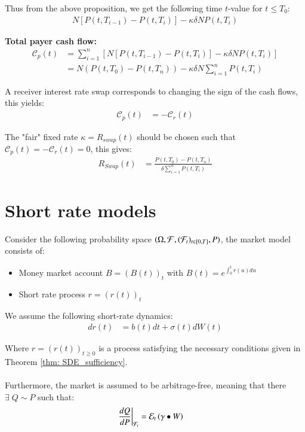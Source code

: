 Thus from the above proposition, we get the following time $t$-value for $t\leq T_{0}$:
\begin{align*}
N[P(t,T_{i-1}) - P(t,T_{i})] - \kappa\delta N P(t,T_{i})   
\end{align*}

\textbf{Total payer cash flow:}
\begin{align*}
\mathcal{C}_{p}(t) &= \sum_{i=1}^{n}\left[
 N[P(t,T_{i-1}) - P(t,T_{i})] - \kappa\delta N P(t,T_{i}) 
\right]  \\
&= N(P(t,T_{0})-P(t,T_{n})) - \kappa\delta N\sum_{i=1}^{n}P(t,T_{i})
\end{align*} 

A receiver interest rate swap corresponds to changing the sign of the cash flows, this yields:
\begin{align*}
\mathcal{C}_{p}(t) &= -\mathcal{C}_{r}(t)    
\end{align*}

\begin{result}
The "fair" fixed rate $\kappa = R_{swap}(t)$ should be chosen such that $\mathcal{C}_{p}(t) = -\mathcal{C}_{r}(t) = 0$, this gives:
\begin{align*}
R_{Swap}(t) &= \frac{P(t,T_{0}) - P(t,T_{n})}{\delta \sum_{i=1}^{n}P(t,T_{i})}
\end{align*} 
\end{result}

\newpage

\section{Short rate models}
Consider the following probability space $(\Omega, \mathcal{F}, (\mathcal{F}_{t})_{t \in [0,T]}, P)$, the market model consists of:
\begin{itemize}
    \item Money market account $B = (B(t))_{t}$ with $B(t) = e^{\int_{0}^{t}r(u)du}$
    \item Short rate process $r = (r(t))_{t}$
\end{itemize}

We assume the following short-rate dynamics:
\begin{align*}
dr(t) &= b(t)dt + \sigma(t)dW(t)   
\end{align*} 

Where $r = (r(t))_{t\geq 0}$ is a process satisfying the necessary conditions given in Theorem \ref{thm: SDE_sufficiency}. 
\\~\\
Furthermore, the market is assumed to be arbitrage-free, meaning that there $\exists \; Q\sim P$ such that: 
\begin{align*}
\frac{dQ}{dP}\bigg{|}_{\mathcal{F}_{t}} &= \mathcal{E}_{t}\left(
\gamma \bullet W
\right)    
\end{align*}

